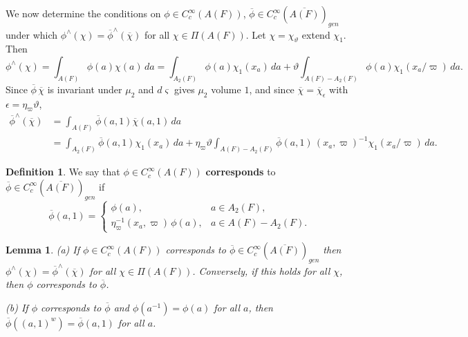 \documentclass[12pt,letterpaper,openany]{book}
\theoremstyle{plain}
\newtheorem{lemma}[theorem]{Lemma}
\theoremstyle{definition}
\newtheorem{definition}[theorem]{Definition}
\theoremstyle{remark}
\theoremstyle{remark}
\begin{document}
We now determine the conditions on
$\phi \in C_c^\infty(A(F))$,
$\overline{\phi}
\in C_c^\infty(\overline{A(F)})_{gen}$
under which
$\phi^{\wedge}(\chi)=
\overline{\phi}^{\wedge}(\overline{\chi})$ for all $\chi \in \Pi(A(F))$.
Let $\chi=\chi_\vartheta$ extend $\chi_1$. Then
\begin{equation}\label{eq:FT-lin}
\phi^{\wedge}(\chi)=
\int_{A(F)}\phi(a)\chi(a)\, da
=\int_{A_2(F)}\phi(a)\chi_1(x_a)\, da +
\vartheta \int_{A(F)-A_2(F)}\phi(a)\chi_1(x_a/\varpi)\, da .
\end{equation}
Since $\overline{\phi}\,\overline{\chi}$ is invariant under
$\mu_2$ and $d\varsigma$ gives $\mu_2$ volume $1$, and since
$\overline{\chi}=\overline{\chi}_{\epsilon}$ with
$\epsilon=\eta_\varpi\vartheta$,
\begin{equation}\label{eq:FT-gen}
\begin{aligned}
\overline{\phi}^{\wedge}(\overline{\chi})&=
\int_{A(F)}\overline{\phi}(a,1)\overline{\chi}(a,1)\, da\\
&=\int_{A_2(F)}\overline{\phi}(a,1)\chi_1(x_a)\, da +
\eta_\varpi\vartheta \int_{A(F)-A_2(F)}\overline{\phi}(a,1)\,(x_a,\varpi)^{-1}
\chi_1(x_a/\varpi)\, da.
\end{aligned}
\end{equation}

\begin{definition}\label{def:corrA} We say that
$\phi \in C_c^\infty(A(F))$ {\bf corresponds} to
$\overline{\phi}
\in C_c^\infty(\overline{A(F)})_{gen}$
if
\[
\overline{\phi}(a,1)=
\left\{
\begin{array}{ll}
\phi(a), & a\in A_2(F),\\
\eta_\varpi^{-1}(x_a,\varpi)\,\phi(a), & a\in A(F)-A_2(F).
\end{array}
\right.
\]
\end{definition}

\begin{lemma}\label{lem:FT-match}
(a) If $\phi \in C_c^\infty(A(F))$ corresponds to
$\overline{\phi}\in C_c^\infty(\overline{A(F)})_{gen}$
then
$\phi^{\wedge}(\chi)=
\overline{\phi}^{\wedge}(\overline{\chi})$
for all $\chi \in \Pi(A(F))$. Conversely, if this holds for all $\chi$,
then $\phi$ corresponds to $\overline{\phi}$.

(b) If $\phi$ corresponds to $\overline{\phi}$ and $\phi(a^{-1})=\phi(a)$
for all $a$, then $\overline{\phi}((a,1)^w)=\overline{\phi}(a,1)$ for all
$a$.
\end{lemma}
\end{document}
